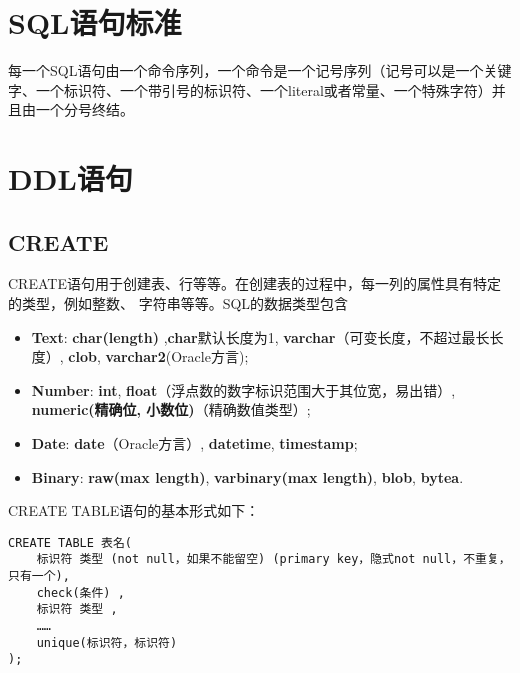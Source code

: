 \documentclass[12pt,a4paper,UTF8]{ctexbook}
\theoremstyle{plain}
\begin{document}
\section{SQL语句标准} 
每一个SQL语句由一个命令序列，一个命令是一个记号序列（记号可以是一个关键字、一个标识符、一个带引号的标识符、一个literal或者常量、一个特殊字符）并且由一个分号终结。


\section{DDL语句} 

\subsection{CREATE}
CREATE语句用于创建表、行等等。在创建表的过程中，每一列的属性具有特定的类型，例如整数、
字符串等等。SQL的数据类型包含
\begin{itemize} 
  \item \textbf{Text}: \textbf{char(length)} ,\textbf{char}默认长度为1, \textbf{varchar}（可变长度，不超过最长长度）, \textbf{clob}, \textbf{varchar2}(Oracle方言);
  \item \textbf{Number}: \textbf{int}, \textbf{float}（浮点数的数字标识范围大于其位宽，易出错）, \textbf{numeric(精确位, 小数位)}（精确数值类型）;
  \item \textbf{Date}: \textbf{date}（Oracle方言）, \textbf{datetime}, \textbf{timestamp};
  \item \textbf{Binary}: \textbf{raw(max length)}, \textbf{varbinary(max length)}, \textbf{blob}, \textbf{bytea}.
\end{itemize}
CREATE TABLE语句的基本形式如下：
\begin{lstlisting} 
CREATE TABLE 表名(
    标识符 类型 (not null，如果不能留空) (primary key，隐式not null，不重复，只有一个),
    check(条件) ,
    标识符 类型 ,
    ……
    unique(标识符，标识符)
);
\end{lstlisting}
\end{document}
